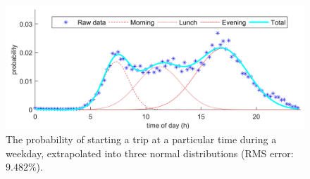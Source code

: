 \begin{figure}[htb]\centering
 	\includegraphics{_chapter1/fig/input/starting-a-trip-probability}
	\caption{The probability of starting a trip at a particular time during a weekday, extrapolated into three normal distributions (RMS error: $9.482\%$).}
	\label{ch1:fig:starting-a-trip-probability}
\end{figure}
